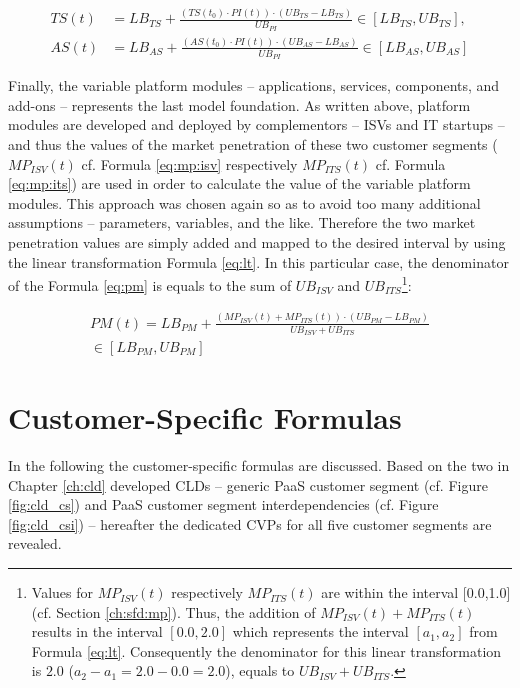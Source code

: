 \begin{align}
	TS(t) &= LB_{TS} +  \frac{(TS(t_0) \cdot PI(t)) \cdot (UB_{TS} - LB_{TS})}{UB_{PI}} \in [LB_{TS},UB_{TS}],\label{eq:ts}\\
	AS(t) &= LB_{AS} +  \frac{(AS(t_0) \cdot PI(t)) \cdot (UB_{AS} - LB_{AS})}{UB_{PI}} \in [LB_{AS},UB_{AS}]\label{eq:as}
\end{align} 

Finally, the variable platform modules -- applications, services, components, and add-ons -- represents the last model foundation. As written above, platform modules are developed and deployed by complementors -- \acp{ISV} and \ac{IT} startups -- and thus the values of the market penetration of these two customer segments ($MP_{ISV}(t)$ cf. Formula \ref{eq:mp:isv} respectively $MP_{ITS}(t)$ cf. Formula \ref{eq:mp:its}) are used in order to calculate the value of the variable platform modules. This approach was chosen again so as to avoid too many additional assumptions -- parameters, variables, and the like. Therefore the two market penetration values are simply added and mapped to the desired interval by using the linear transformation Formula \ref{eq:lt}. In this particular case, the denominator of the Formula \ref{eq:pm} is equals to the sum of $UB_{ISV}$ and $UB_{ITS}$\footnote{Values for $MP_{ISV}(t)$ respectively $MP_{ITS}(t)$ are within the interval [0.0,1.0] (cf. Section \ref{ch:sfd:mp}). Thus, the addition of $MP_{ISV}(t) + MP_{ITS}(t)$ results in the interval $[0.0,2.0]$ which represents the interval $[a_1,a_2]$ from Formula \ref{eq:lt}. Consequently the denominator for this linear transformation is $2.0$ ($a_2 - a_1 = 2.0 - 0.0 = 2.0$), equals to $UB_{ISV} + UB_{ITS}$.}:

\begin{eqnarray}\label{eq:pm}
	PM(t) = LB_{PM} + \frac{(MP_{ISV}(t) + MP_{ITS}(t)) \cdot (UB_{PM} - LB_{PM})}{UB_{ISV} + UB_{ITS}} \nonumber \\ \in [LB_{PM},UB_{PM}]
\end{eqnarray}

\section{Customer-Specific Formulas}\label{ch:sfd:csf}

In the following the customer-specific formulas are discussed. Based on the two in Chapter \ref{ch:cld} developed \acp{CLD} -- generic \ac{PaaS} customer segment (cf. Figure \ref{fig:cld_cs}) and \ac{PaaS} customer segment interdependencies (cf. Figure \ref{fig:cld_csi}) -- hereafter the dedicated \acp{CVP} for all five customer segments are revealed.

